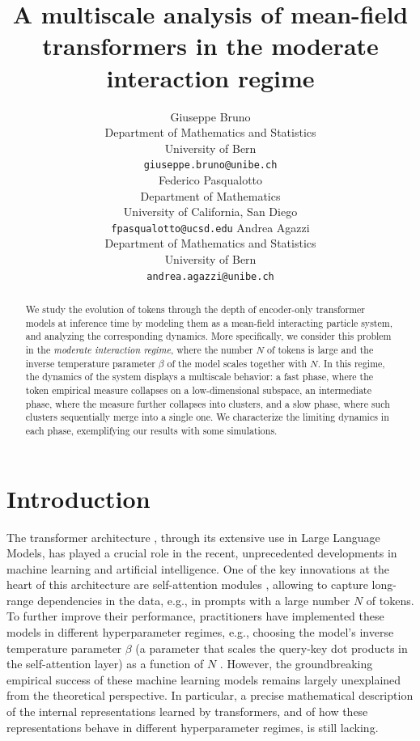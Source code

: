 \documentclass{article}
\title{A multiscale analysis of mean-field transformers in the moderate interaction regime}
\author{
  Giuseppe Bruno\\
  Department of Mathematics and Statistics\\
  University of Bern\\
  \texttt{giuseppe.bruno@unibe.ch} \\
  \And
  Federico Pasqualotto \\
  Department of Mathematics\\
  University of California, San Diego\\
  \texttt{fpasqualotto@ucsd.edu} 
  \AND
  Andrea Agazzi \\
  Department of Mathematics and Statistics\\
  University of Bern\\
  \texttt{andrea.agazzi@unibe.ch} 
}
\numberwithin{theorem}{section}
\begin{document}
\maketitle


\begin{abstract}
  We study the evolution of tokens through the depth of encoder-only transformer models at inference time by modeling them as a mean-field interacting particle system, and analyzing the corresponding dynamics. More specifically, we consider this problem in the \emph{moderate interaction regime}, where the number $N$ of tokens is large and the inverse temperature parameter $\beta$ of the model scales together with $N$. In this regime, the dynamics of the system displays a multiscale behavior: a fast phase, where the token empirical measure collapses on a low-dimensional subspace, an intermediate phase, where the measure further collapses into clusters, and a slow phase, where such clusters sequentially merge into a single one. We characterize the limiting dynamics in each phase, exemplifying our results with some simulations.
\end{abstract}\vspace{-0.1cm}

\section{Introduction}

The transformer architecture \cite{vaswani2017attention}, through its extensive use in Large Language Models, has played a crucial role in the recent, unprecedented developments in machine learning and artificial intelligence. One of the key innovations at the heart of this architecture are self-attention modules \cite{bahdanau2014neural}, allowing to capture long-range dependencies in the data, e.g., in prompts with a large number $N$ of tokens. To further improve their performance, practitioners have implemented these models in different hyperparameter regimes, e.g., choosing the model's inverse temperature parameter $\beta$ (a parameter that scales the query-key dot products in the self-attention layer) as a function of $N$ \cite{nakanishi2025scalable,peng2023yarn}. However, the groundbreaking empirical success of these machine learning models remains largely unexplained from the theoretical perspective. In particular, a precise mathematical description of the internal representations learned by transformers, and of how these representations behave in different hyperparameter regimes, is still lacking.
\end{document}
